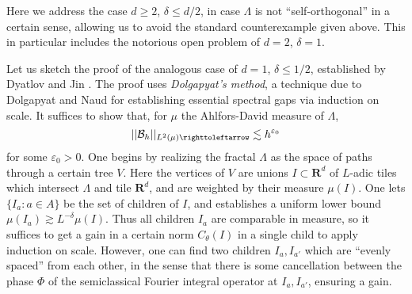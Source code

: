 \documentclass[reqno,10pt]{amsart}
\newcommand{\RR}{\mathbf{R}}
\newcommand{\dfn}[1]{\emph{#1}\index{#1}}
\theoremstyle{definition}
\numberwithin{equation}{section}
\begin{document}
Here we address the case $d \geq 2$, $\delta \leq d/2$, in case $\Lambda$ is not ``self-orthogonal'' in a certain sense, allowing us to avoid the standard counterexample given above.
This in particular includes the notorious open problem of $d = 2$, $\delta = 1$.

Let us sketch the proof of the analogous case of $d = 1$, $\delta \leq 1/2$, established by Dyatlov and Jin \cite{Dyatlov_2018}.
The proof uses \dfn{Dolgapyat's method}, a technique due to Dolgapyat and Naud \cite{10.2307/121012, ASENS_2005_4_38_1_116_0} for establishing essential spectral gaps via induction on scale.
It suffices to show that, for $\mu$ the Ahlfors-David measure of $\Lambda$,
$$||\mathcal B_h||_{L^2(\mu) \righttoleftarrow} \lesssim h^{\varepsilon_0}$$
for some $\varepsilon_0 > 0$.
One begins by realizing the fractal $\Lambda$ as the space of paths through a certain tree $V$.
Here the vertices of $V$ are unions $I \subset \RR^d$ of $L$-adic tiles which intersect $\Lambda$ and tile $\RR^d$, and are weighted by their measure $\mu(I)$.
One lets $\{I_a: a \in A\}$ be the set of children of $I$, and establishes a uniform lower bound $\mu(I_a) \gtrsim L^{-\delta} \mu(I)$.
Thus all children $I_a$ are comparable in measure, so it suffices to get a gain in a certain norm $C_\theta(I)$ in a single child to apply induction on scale.
However, one can find two children $I_a, I_{a'}$ which are ``evenly spaced'' from each other, in the sense that there is some cancellation between the phase $\Phi$ of the semiclassical Fourier integral operator at $I_a, I_{a'}$, ensuring a gain.
\end{document}
